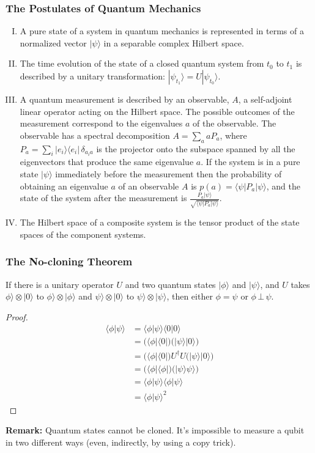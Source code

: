 \documentclass[UTF8,11pt,colorlinks,compress,openany]{beamer}%
\begin{document}
\begin{frame}\frametitle{The Postulates of Quantum Mechanics}
\begin{enumerate}[I.]
	\item A pure state of a system in quantum mechanics is represented in terms of a normalized vector $|\psi\rangle$ in a separable complex Hilbert space.
	\item The time evolution of the state of a closed quantum system from $t_0$ to $t_1$ is described by a unitary transformation: $|\psi_{t_1}\rangle = U|\psi_{t_0}\rangle$.
	\item A quantum measurement is described by an observable, $A$, a self-adjoint linear operator acting on the Hilbert space. The possible outcomes of the measurement correspond to the eigenvalues $a$ of the observable. The observable has a spectral decomposition $A=\sum\limits_a aP_a$, where $P_a=\sum\limits_i|e_i\rangle\langle e_i|\,\delta_{a_ia}$ is the projector onto the subspace spanned by all the eigenvectors that produce the same eigenvalue $a$. If the system is in a pure state $|\psi\rangle$ immediately before the measurement then the probability of obtaining an eigenvalue $a$ of an observable $A$ is $p(a)=\langle\psi|P_a|\psi\rangle$, and the state of the system after the measurement is $\frac{P_a|\psi\rangle}{\sqrt{\langle\psi|P_a|\psi\rangle}}$.
	\item The Hilbert space of a composite system is the tensor product of the state spaces of the component systems.
\end{enumerate}
\end{frame}

\begin{frame}\frametitle{The No-cloning Theorem}
\setlength\abovedisplayskip{0pt}
\setlength\belowdisplayskip{0pt}
	\begin{theorem}
	If there is a unitary operator $U$ and two quantum states $|\phi\rangle$ and $|\psi\rangle$, and $U$ takes $\phi\rangle\otimes|0\rangle$ to $\phi\rangle\otimes|\phi\rangle$ and $\psi\rangle\otimes|0\rangle$ to $\psi\rangle\otimes|\psi\rangle$, then either $\phi=\psi$ or $\phi\,\bot\,\psi$.
\end{theorem}
\begin{proof}
\begin{align*}
	\langle \phi|\psi\rangle&=\langle \phi|\psi\rangle\langle 0|0\rangle\\
	&=\big(\langle\phi|\langle 0|\big)\big(|\psi\rangle|0\rangle\big)\\
	&=\big(\langle\phi|\langle 0|\big) U^\dagger U\big(|\psi\rangle|0\rangle\big)\\
	&=\big(\langle\phi|\langle\phi|\big)\big(|\psi\rangle\psi\rangle\big)\\
	&=\langle\phi|\psi\rangle\langle\phi|\psi\rangle\\
	&=\langle\phi|\psi\rangle^2
\end{align*}\vspace*{-2ex}
\end{proof}
\textbf{Remark:} Quantum states cannot be cloned. It's impossible to measure a qubit in two different ways (even, indirectly, by using a copy trick).
\end{frame}
\end{document}
